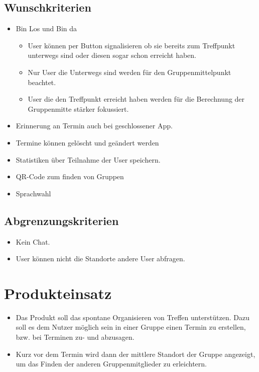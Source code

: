 \documentclass{scrartcl}
\begin{document}
	\subsection{Wunschkriterien}
	\begin{itemize}
		\item \grqq{}Bin Los\grqq{} und \grqq{}Bin da\grqq{}
		\begin{itemize}
			\item User können per Button signalisieren ob sie bereits zum Treffpunkt unterwegs sind oder diesen sogar schon erreicht haben.
			\item Nur User die Unterwegs sind werden für den Gruppenmittelpunkt beachtet.
			\item User die den Treffpunkt erreicht haben werden für die Berechnung der Gruppenmitte stärker fokussiert.
		\end{itemize}
		\item Erinnerung an Termin auch bei geschlossener App.
		\item Termine können gelöscht und geändert werden
		\item Statistiken über Teilnahme der User speichern.
		\item QR-Code zum finden von Gruppen
		\item Sprachwahl
	\end{itemize}
	\subsection{Abgrenzungskriterien}
	\begin{itemize}
		\item Kein Chat.
		\item User können nicht die Standorte andere User abfragen.
	\end{itemize}
	
	\newpage
	
	
	
	\section{Produkteinsatz}
	\begin{itemize}	        
		\item Das Produkt soll das spontane Organisieren von Treffen unterstützen. Dazu soll es dem Nutzer möglich sein in einer Gruppe einen Termin zu erstellen, bzw. bei Terminen zu- und abzusagen.
		\item Kurz vor dem Termin wird dann der mittlere Standort der Gruppe angezeigt, um das Finden der anderen Gruppenmitglieder zu erleichtern.
	\end{itemize}
\end{document}
